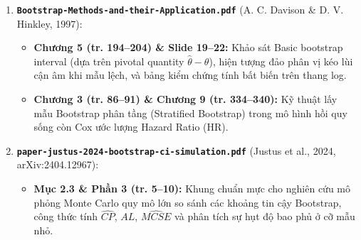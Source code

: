 \documentclass[10pt,a4paper]{article}
\begin{document}
\begin{enumerate}
    \item \textbf{\texttt{Bootstrap-Methods-and-their-Application.pdf}} (A. C. Davison \& D. V. Hinkley, 1997):
    \begin{itemize}
        \item \textbf{Chương 5 (tr. 194--204) \& Slide 19--22:} Khảo sát Basic bootstrap interval (dựa trên pivotal quantity $\hat\theta - \theta$), hiện tượng đảo phân vị kéo lùi cận âm khi mẫu lệch, và bảng kiểm chứng tính bất biến trên thang log.
        \item \textbf{Chương 3 (tr. 86--91) \& Chương 9 (tr. 334--340):} Kỹ thuật lấy mẫu Bootstrap phân tầng (Stratified Bootstrap) trong mô hình hồi quy sống còn Cox ước lượng Hazard Ratio (HR).
    \end{itemize}

    \item \textbf{\texttt{paper-justus-2024-bootstrap-ci-simulation.pdf}} (Justus et al., 2024, arXiv:2404.12967):
    \begin{itemize}
        \item \textbf{Mục 2.3 \& Phần 3 (tr. 5--10):} Khung chuẩn mực cho nghiên cứu mô phỏng Monte Carlo quy mô lớn so sánh các khoảng tin cậy Bootstrap, công thức tính $\widehat{CP}$, $AL$, $\widehat{MCSE}$ và phân tích sự hụt độ bao phủ ở cỡ mẫu nhỏ.
    \end{itemize}
\end{enumerate}
\end{document}
